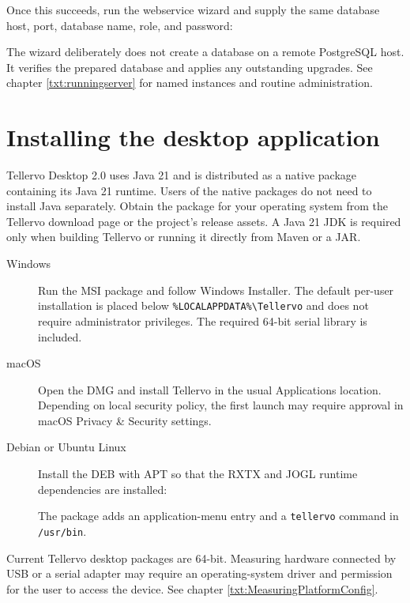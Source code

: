 Once this succeeds, run the webservice wizard and supply the same database
host, port, database name, role, and password:


The wizard deliberately does not create a database on a remote PostgreSQL
host. It verifies the prepared database and applies any outstanding upgrades.
See chapter \ref{txt:runningserver} for named instances and routine
administration.

\section{Installing the desktop application}
\label{txt:desktopinstall}

Tellervo Desktop 2.0 uses Java 21 and is distributed as a native package
containing its Java 21 runtime. Users of the native packages do not need to
install Java separately. Obtain the package for your operating system from the
Tellervo download page or the project's release assets. A Java 21 JDK is
required only when building Tellervo or running it directly from Maven or a
JAR.

\begin{description}
 \item[Windows] Run the MSI package and follow Windows Installer. The default
 per-user installation is placed below \verb|%LOCALAPPDATA%\Tellervo| and does
 not require administrator privileges. The required 64-bit serial library is
 included.
 \item[macOS] Open the DMG and install Tellervo in the usual Applications
 location. Depending on local security policy, the first launch may require
 approval in macOS Privacy \& Security settings.
 \item[Debian or Ubuntu Linux] Install the DEB with APT so that the RXTX and
 JOGL runtime dependencies are installed:


 The package adds an application-menu entry and a \verb|tellervo| command in
 \verb|/usr/bin|.
\end{description}

Current Tellervo desktop packages are 64-bit. Measuring hardware connected by
USB or a serial adapter may require an operating-system driver and permission
for the user to access the device. See chapter
\ref{txt:MeasuringPlatformConfig}.

